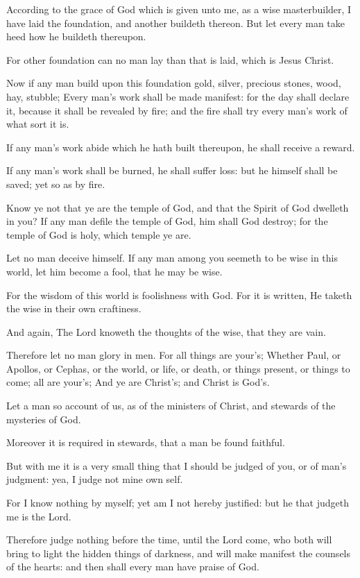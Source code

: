 \Verse According to the grace of God which is given unto me, as a wise masterbuilder, I have laid the foundation, and another buildeth thereon. But let every man take heed how he buildeth thereupon.

\Verse For other foundation can no man lay than that is laid, which is Jesus Christ.

\Verse Now if any man build upon this foundation gold, silver, precious stones, wood, hay, stubble; \Verse Every man's work shall be made manifest: for the day shall declare it, because it shall be revealed by fire; and the fire shall try every man's work of what sort it is.

\Verse If any man's work abide which he hath built thereupon, he shall receive a reward.

\Verse If any man's work shall be burned, he shall suffer loss: but he himself shall be saved; yet so as by fire.

\Verse Know ye not that ye are the temple of God, and that the Spirit of God dwelleth in you?  \Verse If any man defile the temple of God, him shall God destroy; for the temple of God is holy, which temple ye are.

\Verse Let no man deceive himself. If any man among you seemeth to be wise in this world, let him become a fool, that he may be wise.

\Verse For the wisdom of this world is foolishness with God. For it is written, He taketh the wise in their own craftiness.

\Verse And again, The Lord knoweth the thoughts of the wise, that they are vain.

\Verse Therefore let no man glory in men. For all things are your's; \Verse Whether Paul, or Apollos, or Cephas, or the world, or life, or death, or things present, or things to come; all are your's; \Verse And ye are Christ's; and Christ is God's.


\Chapter
\Verse Let a man so account of us, as of the ministers of Christ, and stewards of the mysteries of God.

\Verse Moreover it is required in stewards, that a man be found faithful.

\Verse But with me it is a very small thing that I should be judged of you, or of man's judgment: yea, I judge not mine own self.

\Verse For I know nothing by myself; yet am I not hereby justified: but he that judgeth me is the Lord.

\Verse Therefore judge nothing before the time, until the Lord come, who both will bring to light the hidden things of darkness, and will make manifest the counsels of the hearts: and then shall every man have praise of God.

